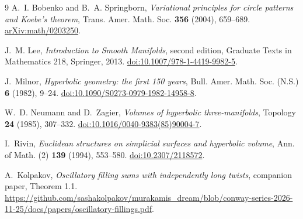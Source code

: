 \documentclass[11pt]{article}
\numberwithin{equation}{section}
\theoremstyle{definition}
\theoremstyle{remark}
\begin{document}
\begin{thebibliography}{9}
A.~I. Bobenko and B.~A. Springborn,
\emph{Variational principles for circle patterns and Koebe's theorem},
Trans. Amer. Math. Soc. \textbf{356} (2004), 659--689.
\href{https://arxiv.org/abs/math/0203250}{arXiv:math/0203250}.

J.~M. Lee, \emph{Introduction to Smooth Manifolds}, second edition,
Graduate Texts in Mathematics 218, Springer, 2013.
\href{https://doi.org/10.1007/978-1-4419-9982-5}
{doi:10.1007/978-1-4419-9982-5}.

J.~Milnor, \emph{Hyperbolic geometry: the first 150 years},
Bull. Amer. Math. Soc. (N.S.) \textbf{6} (1982), 9--24.
\href{https://doi.org/10.1090/S0273-0979-1982-14958-8}
{doi:10.1090/S0273-0979-1982-14958-8}.

W.~D. Neumann and D.~Zagier,
\emph{Volumes of hyperbolic three-manifolds},
Topology \textbf{24} (1985), 307--332.
\href{https://doi.org/10.1016/0040-9383(85)90004-7}
{doi:10.1016/0040-9383(85)90004-7}.

I.~Rivin, \emph{Euclidean structures on simplicial surfaces and
hyperbolic volume}, Ann. of Math. (2) \textbf{139} (1994), 553--580.
\href{https://doi.org/10.2307/2118572}{doi:10.2307/2118572}.

A.~Kolpakov, \emph{Oscillatory filling sums with independently long twists},
companion paper, Theorem 1.1.
\url{https://github.com/sashakolpakov/murakamis_dream/blob/conway-series-2026-11-25/docs/papers/oscillatory-fillings.pdf}.
\end{thebibliography}
\end{document}
